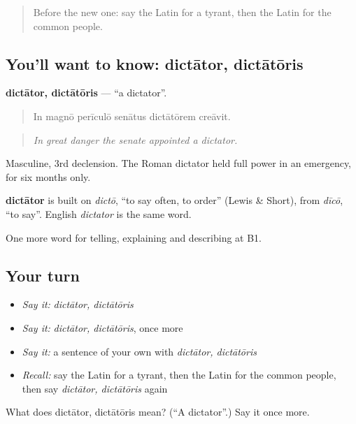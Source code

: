 \label{lesson:LA-C345-dictator}



\begin{quote}
Before the new one: say the Latin for a tyrant, then the Latin for the common people.
\end{quote}

\subsection*{You'll want to know: dictātor, dictātōris}
\textbf{dictātor, dictātōris} — \textquotedblleft{}a dictator\textquotedblright{}.

\begin{quote}
In magnō perīculō senātus dictātōrem creāvit.
\end{quote}

\begin{quote}
\emph{In great danger the senate appointed a dictator.}
\end{quote}

Masculine, 3rd declension. The Roman dictator held full power in an emergency, for six months only.

\begin{cousinweb}
\textbf{dictātor} is built on \emph{dictō}, \textquotedblleft{}to say often, to order\textquotedblright{} (Lewis \& Short), from \emph{dīcō}, \textquotedblleft{}to say\textquotedblright{}. English \emph{dictator} is the same word.
\end{cousinweb}

\begin{grammarlens}[title={What you've built}]
One more word for telling, explaining and describing at B1.
\end{grammarlens}

\subsection*{Your turn}
\begin{itemize}
\raggedright
  \item \emph{Say it:} \emph{dictātor, dictātōris}
  \item \emph{Say it:} \emph{dictātor, dictātōris}, once more
  \item \emph{Say it:} a sentence of your own with \emph{dictātor, dictātōris}
  \item \emph{Recall:} say the Latin for a tyrant, then the Latin for the common people, then say \emph{dictātor, dictātōris} again
\end{itemize}

\begin{tcolorbox}[breakable,colback=teal!4,colframe=teal!35!black,title={Before you move on}]
What does dictātor, dictātōris mean? (\textquotedblleft{}A dictator\textquotedblright{}.) Say it once more.
\end{tcolorbox}

